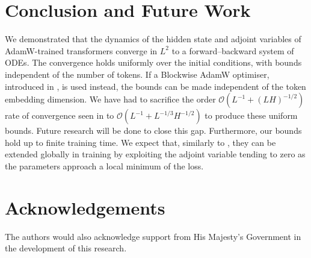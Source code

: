 \documentclass{article}
\begin{document}
\section{Conclusion and Future Work}
We demonstrated that the dynamics of the hidden state and adjoint variables of AdamW-trained transformers converge in $L^2$ to a forward--backward system of ODEs. The convergence holds uniformly over the initial conditions, with bounds independent of the number of tokens. If a Blockwise AdamW optimiser, introduced in \cite{xie2024adam}, is used instead, the bounds can be made independent of the token embedding dimension. We have had to sacrifice the order $\mathcal O(L^{-1}+(LH)^{-1/2})$ rate of convergence seen in \cite{chizat2025hiddenwidthdeepresnets} to  $\mathcal O(L^{-1}+L^{-1/3}H^{-1/2})$ to produce these uniform bounds. Future research will be done to close this gap. Furthermore, our bounds hold up to finite training time. We expect that, similarly to \cite{marion2024implicit}, they can be extended globally in training by exploiting the adjoint variable tending to zero as the parameters approach a local minimum of the loss.


\section{Acknowledgements}
The authors would also acknowledge support from His Majesty’s Government in the development of this research.



\end{document}
